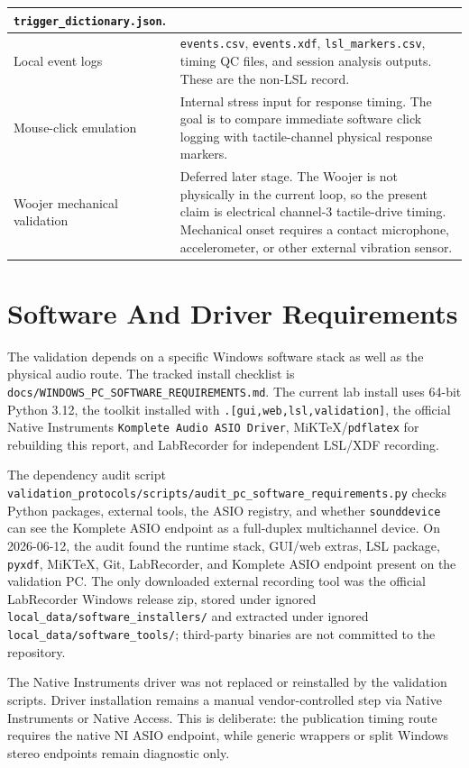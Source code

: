 \documentclass[11pt]{article}
\begin{document}
\begin{longtable}{|p{}|p{}|}
\texttt{trigger\_dictionary.json}. \\
\hline
Local event logs & \texttt{events.csv}, \texttt{events.xdf},
\texttt{lsl\_markers.csv}, timing QC files, and session analysis outputs.
These are the non-LSL record. \\
\hline
Mouse-click emulation & Internal stress input for response timing. The goal is
to compare immediate software click logging with tactile-channel physical
response markers. \\
\hline
Woojer mechanical validation & Deferred later stage. The Woojer is not
physically in the current loop, so the present claim is electrical channel-3
tactile-drive timing. Mechanical onset requires a contact microphone,
accelerometer, or other external vibration sensor. \\
\hline
\end{longtable}

\section{Software And Driver Requirements}

The validation depends on a specific Windows software stack as well as the
physical audio route. The tracked install checklist is
\texttt{docs/WINDOWS\_PC\_SOFTWARE\_REQUIREMENTS.md}. The current lab install
uses 64-bit Python 3.12, the toolkit installed with
\texttt{.[gui,web,lsl,validation]}, the official Native Instruments
\texttt{Komplete Audio ASIO Driver}, MiKTeX/\texttt{pdflatex} for rebuilding
this report, and LabRecorder for independent LSL/XDF recording.

The dependency audit script
\texttt{validation\_protocols/scripts/audit\_pc\_software\_requirements.py}
checks Python packages, external tools, the ASIO registry, and whether
\texttt{sounddevice} can see the Komplete ASIO endpoint as a full-duplex
multichannel device. On 2026-06-12, the audit found the runtime stack, GUI/web
extras, LSL package, \texttt{pyxdf}, MiKTeX, Git, LabRecorder, and Komplete
ASIO endpoint present on the validation PC. The only downloaded external
recording tool was the official LabRecorder Windows release zip, stored under
ignored \texttt{local\_data/software\_installers/} and extracted under ignored
\texttt{local\_data/software\_tools/}; third-party binaries are not committed to
the repository.

The Native Instruments driver was not replaced or reinstalled by the validation
scripts. Driver installation remains a manual vendor-controlled step via Native
Instruments or Native Access. This is deliberate: the publication timing route
requires the native NI ASIO endpoint, while generic wrappers or split Windows
stereo endpoints remain diagnostic only.
\end{document}

